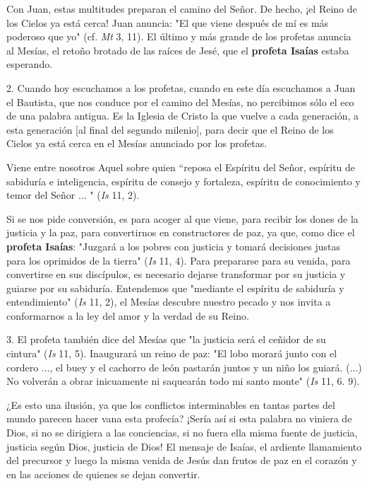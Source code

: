 \begin{body}
\begin{body}
Con Juan, estas multitudes preparan el camino del Señor. De hecho, ¡el Reino de los Cielos ya está cerca! Juan anuncia: "El que viene después de mí es más poderoso que yo" (cf. \emph{Mt} 3, 11). El último y más grande de los profetas anuncia al Mesías, el retoño brotado de las raíces de Jesé, que el \textbf{profeta Isaías} estaba esperando.

2. Cuando hoy escuchamos a los profetas, cuando en este día escuchamos a Juan el Bautista, que nos conduce por el camino del Mesías, no percibimos sólo el eco de una palabra antigua. Es la Iglesia de Cristo la que vuelve a cada generación, a esta generación {[}al final del segundo milenio{]}, para decir que el Reino de los Cielos ya está cerca en el Mesías anunciado por los profetas.

Viene entre nosotros Aquel sobre quien ``reposa el Espíritu del Señor, espíritu de sabiduría e inteligencia, espíritu de consejo y fortaleza, espíritu de conocimiento y temor del Señor ... " (\emph{Is} 11, 2).

Si se nos pide conversión, es para acoger al que viene, para recibir los dones de la justicia y la paz, para convertirnos en constructores de paz, ya que, como dice el \textbf{profeta Isaías}: "Juzgará a los pobres con justicia y tomará decisiones justas para los oprimidos de la tierra" (\emph{Is} 11, 4). Para prepararse para su venida, para convertirse en sus discípulos, es necesario dejarse transformar por su justicia y guiarse por su sabiduría. Entendemos que "mediante el espíritu de sabiduría y entendimiento" (\emph{Is} 11, 2), el Mesías descubre nuestro pecado y nos invita a conformarnos a la ley del amor y la verdad de su Reino.

3. El profeta también dice del Mesías que "la justicia será el ceñidor de su cintura" (\emph{Is} 11, 5). Inaugurará un reino de paz: "El lobo morará junto con el cordero ..., el buey y el cachorro de león pastarán juntos y un niño los guiará. (...) No volverán a obrar inicuamente ni saquearán todo mi santo monte" (\emph{Is} 11, 6. 9).

¿Es esto una ilusión, ya que los conflictos interminables en tantas partes del mundo parecen hacer vana esta profecía? ¡Sería así si esta palabra no viniera de Dios, si no se dirigiera a las conciencias, si no fuera ella misma fuente de justicia, justicia según Dios, justicia de Dios! El mensaje de Isaías, el ardiente llamamiento del precursor y luego la misma venida de Jesús dan frutos de paz en el corazón y en las acciones de quienes se dejan convertir.


\end{body}
\end{body}
